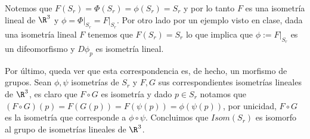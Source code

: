 \documentclass{article}
\begin{document}
\noindent Notemos que $F(S_{r})=\Phi(S_{r})=\phi(S_{r})=S_{r}$ y por lo tanto $F$ es una isometría 
lineal de $\R^{3}$ y $\phi=\Phi\big|_{S_{r}}=F\big|_{S_{r}}$. Por otro lado por un ejemplo visto 
en clase, dada una isometría lineal $F$ tenemos que $F(S_{r})=S_{r}$ lo que implica que
$\phi:=F\big|_{S_{r}}$ es un difeomorfismo y $D\phi_{p}$ es isometría lineal.

\vspace{2mm}
\noindent Por último, queda ver que esta correspondencia es, de hecho, un morfismo de grupos. Sean
$\phi,\psi$ isometrías de $S_{r}$ y $F,G$ sus correspondientes isometrías lineales de $\R^{3}$, es 
claro que $F\circ G$ es isometría y dado $p\in S_{r}$ notamos que $(F\circ G)(p)=F(G(p))=F(\psi(p))
=\phi(\psi(p))$, por unicidad, $F\circ G$ es la isometría que corresponde a $\phi\circ\psi$. 
Concluimos que $Isom(S_{r})$ es isomorfo al grupo de isometrías lineales de $\R^{3}$.
\end{document}
